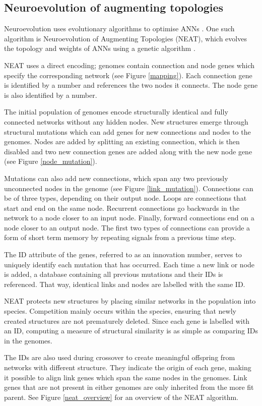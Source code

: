 \subsection{Neuroevolution of augmenting topologies}
Neuroevolution uses evolutionary algorithms to optimise ANNs \cite{neuroevolution_review}.
One such algorithm is Neuroevolution of Augmenting Topologies (NEAT), which evolves the topology and weights of ANNs
using a genetic algorithm \cite{neat_main, neat_short, neat_phd}.

NEAT uses a direct encoding; genomes contain connection and node genes which specify the corresponding
network (see Figure \ref{mapping}). Each connection gene is identified by a number and
references the two nodes it connects. The node gene is also identified by a number.



The initial population of genomes encode structurally identical and fully connected networks without any hidden nodes.
New structures emerge through structural mutations which can add genes for new connections and nodes to the genomes.
Nodes are added by splitting an existing connection, which is then disabled and two new connection genes are added along
with the new node gene (see Figure \ref{node_mutation}).



Mutations can also add new connections, which span any two previously unconnected nodes in the genome (see Figure \ref{link_mutation}).
Connections can be of three types, depending on their output node. Loops are connections that start and end on the same node. Recurrent
connections go backwards in the network to a node closer to an input node. Finally, forward connections end on a node closer to an output
node. The first two types of connections can provide a form of short term memory by repeating signals from a previous time step.



The ID attribute of the genes, referred to as an innovation number, serves to uniquely identify each mutation that has occurred.
Each time a new link or node is added, a database containing all previous mutations and their IDs is referenced. That way,
identical links and nodes are labelled with the same ID.

NEAT protects new structures by placing similar networks in the population into species.
Competition mainly occurs within the species, ensuring that newly created structures are not prematurely deleted.
Since each gene is labelled with an ID, computing a measure of structural similarity is as simple as
comparing IDs in the genomes.

The IDs are also used during crossover to create meaningful offspring from networks with different structure.
They indicate the origin of each gene, making it possible to align link genes which span the same nodes in the genomes. Link genes
that are not present in either genomes are only inherited from the more fit parent. See Figure \ref{neat_overview} for an overview
of the NEAT algorithm.


